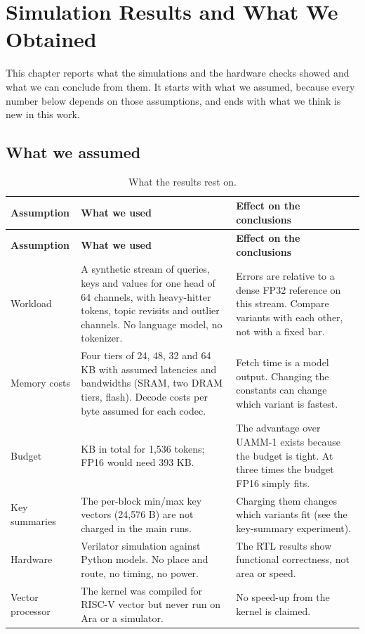 \documentclass[12pt,a4paper]{report}
\begin{document}
\chapter{Simulation Results and What We Obtained}
This chapter reports what the simulations and the hardware checks showed and what we can conclude from them. It starts with what we assumed, because every number below depends on those assumptions, and ends with what we think is new in this work.

\section{What we assumed}
{\fontsize{8}{9.5}\selectfont\setlength{\tabcolsep}{3pt}
\begin{longtable}{>{\raggedright\arraybackslash}p{1.08in}>{\raggedright\arraybackslash}p{2.71in}>{\raggedright\arraybackslash}p{2.17in}}
\caption{What the results rest on.}\\
\toprule
\textbf{Assumption} & \textbf{What we used} & \textbf{Effect on the conclusions} \\\midrule\endfirsthead
\toprule \textbf{Assumption} & \textbf{What we used} & \textbf{Effect on the conclusions} \\\midrule\endhead
\bottomrule\endfoot
Workload & A synthetic stream of queries, keys and values for one head of 64 channels, with heavy-hitter tokens, topic revisits and outlier channels. No language model, no tokenizer. & Errors are relative to a dense FP32 reference on this stream. Compare variants with each other, not with a fixed bar. \\
Memory costs & Four tiers of 24, 48, 32 and 64 KB with assumed latencies and bandwidths (SRAM, two DRAM tiers, flash). Decode costs per byte assumed for each codec. & Fetch time is a model output. Changing the constants can change which variant is fastest. \\
Budget & 168 KB in total for 1,536 tokens; FP16 would need 393 KB. & The advantage over UAMM-1 exists because the budget is tight. At three times the budget FP16 simply fits. \\
Key summaries & The per-block min/max key vectors (24,576 B) are not charged in the main runs. & Charging them changes which variants fit (see the key-summary experiment). \\
Hardware & Verilator simulation against Python models. No place and route, no timing, no power. & The RTL results show functional correctness, not area or speed. \\
Vector processor & The kernel was compiled for RISC-V vector but never run on Ara or a simulator. & No speed-up from the kernel is claimed. \\
\bottomrule
\end{longtable}}
\end{document}
